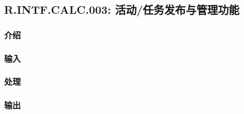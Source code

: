 \subsection{R.INTF.CALC.003: 活动/任务发布与管理功能}
\subsubsection{介绍}
\subsubsection{输入}
\subsubsection{处理}
\subsubsection{输出}